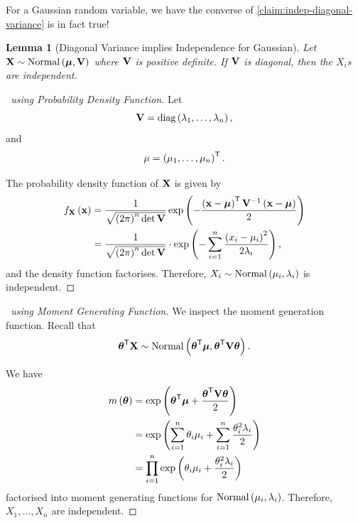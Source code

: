 \documentclass{article}
\newtheorem{lemma}[theorem]{Lemma}
\theoremstyle{definition}
\theoremstyle{remark}
\newcommand{\inverse}{^{-1}}
\newcommand{\transpose}{^{\mathsf{T}}}
\newcommand{\Normal}{\operatorname{Normal}}
\newcommand{\diag}{\operatorname{diag}}
\begin{document}
For a Gaussian random variable, we have the converse of \autoref{claim:indep-diagonal-variance} is in fact true!

\begin{lemma}[Diagonal Variance implies Independence for Gaussian]
    \label{lem:diagonal-variance-independence-gaussian}%
    Let \(\vb{X} \sim \Normal\pqty{\vb*{\mu}, \vb{V}}\) where \(\vb{V}\) is positive definite. If \(\vb{V}\) is diagonal, then the \(X_i\)s are independent.
\end{lemma}

\begin{proof}[\proofname\ using Probability Density Function]
    Let
    \[
        \vb{V} = \diag\pqty{\lambda_1, \ldots, \lambda_n},
    \]
    and
    \[
        \mu = \pqty{\mu_1, \ldots, \mu_n}\transpose.
    \]

    The probability density function of \(\vb{X}\) is given by
    \begin{align*}
        f_{\vb{X}} \pqty{\vb{x}} &= \frac{1}{\sqrt{\pqty{2 \pi}^n \det \vb{V}}} \exp \pqty{- \frac{\pqty{\vb{x} - \vb*{\mu}} \transpose \vb{V}\inverse \pqty{\vb{x} - \vb*{\mu}}}{2}} \\
        &= \frac{1}{\sqrt{\pqty{2\pi}^n \det \vb{V}}} \cdot \exp\pqty{- \sum_{i = 1}^{n} \frac{\pqty{x_i - \mu_i}^2}{2 \lambda_i}},
    \end{align*}
    and the density function factorises. Therefore, \(X_i \sim \Normal\pqty{\mu_i, \lambda_i}\) is independent.
\end{proof}

\begin{proof}[\proofname\ using Moment Generating Function]
    We inspect the moment generation function. Recall that
    \[
        \vb*{\theta}\transpose \vb{X} \sim \Normal\pqty{\vb*{\theta}\transpose \vb*{\mu}, \vb*{\theta}\transpose \vb{V} \vb*{\theta}}.
    \]
    
    We have
    \begin{align*}
        m\pqty{\vb*{\theta}} &= \exp\pqty{\vb*{\theta}\transpose \vb*{\mu} + \frac{\vb*{\theta}\transpose \vb{V} \vb*{\theta}}{2}} \\
        &= \exp\pqty{\sum_{i = 1}^{n} \theta_i \mu_i + \sum_{i = 1}^{n} \frac{\theta_i^2 \lambda_i}{2}} \\
        &= \prod_{i = 1}^{n} \exp\pqty{\theta_i \mu_i + \frac{\theta_i^2 \lambda_i}{2}}
    \end{align*}
    factorised into moment generating functions for \(\Normal\pqty{\mu_i, \lambda_i}\). Therefore, \(X_1, \ldots, X_n\) are independent.
\end{proof}
\end{document}
